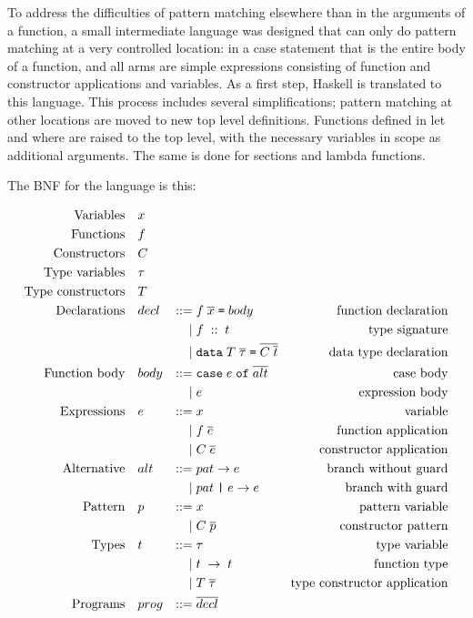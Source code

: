 To address the difficulties of pattern matching elsewhere than in the
arguments of a function, a small intermediate language was designed
that can only do pattern matching at a very controlled location: in a
case statement that is the entire body of a function, and all arms are
simple expressions consisting of function and constructor applications
and variables. As a first step, Haskell is translated to this
language. This process includes several simplifications; pattern
matching at other locations are moved to new top level
definitions. Functions defined in let and where are raised to the
top level, with the necessary variables in scope as additional
arguments. The same is done for sections and lambda functions.

The BNF for the language is this:

\begin{equation*}
\begin{aligned}
\text{Variables} \quad & x \\
\text{Functions} \quad & f \\
\text{Constructors} \quad & C \\
\text{Type variables} \quad & \tau \\
\text{Type constructors} \quad & T \\
\text{Declarations}\quad&decl&::=&\; f \; \overline{x} \; \texttt{=} \; body&\text{function declaration} \\
    &&|&\;f \; :: \; t&\text{type signature} \\
    &&|&\;\texttt{data} \; T \; \overline{\tau} \; \texttt{=} \; \overline{C \; \overline{t}}&\text{data type declaration} \\
\text{Function body}\quad&body&::=&\;\texttt{case} \; e \; \texttt{of} \; \overline{alt}&\text{case body} \\
    &&|&\;e&\text{expression body} \\
\text{Expressions}\quad&e&::=&\;x&\text{variable} \\
    &&|&\;f \; \overline{e}&\text{function application} \\
    &&|&\;C \; \overline{e}&\text{constructor application} \\
\text{Alternative}\quad&alt&::=&\;pat \rightarrow e&\text{branch without guard} \\
    &&|&\;pat \; \texttt{|} \; e \rightarrow e&\text{branch with guard} \\
\text{Pattern}\quad&p&::=&\;x&\text{pattern variable} \\
    &&|&\;C \; \overline{p}&\text{constructor pattern} \\
\text{Types}\quad&t&::=&\;\tau&\text{type variable} \\
    &&|&\;t \; \rightarrow \; t&\text{function type} \\
    &&|&\;T \; \overline{\tau}&\text{type constructor application} \\
\text{Programs}\quad&prog&::=&\;\overline{decl}&\text{} \\
\end{aligned}
\end{equation*}

